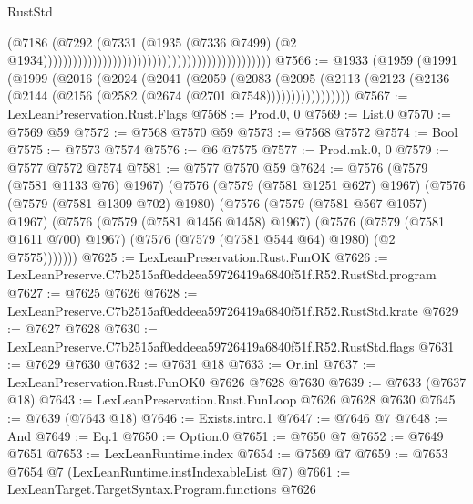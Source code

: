 \begin{lexlean}{RustStd}
\begin{coremodule}
                                                                                      (@7186
                                                                                        (@7292
                                                                                          (@7331
                                                                                            (@1935
                                                                                              (@7336
                                                                                                @7499)
                                                                                              (@2
                                                                                                @1934))))))))))))))))))))))))))))))))))))))))))))))
@7566 := @1933
    (@1959
      (@1991
        (@1999
          (@2016
            (@2024
              (@2041
                (@2059
                  (@2083
                    (@2095
                      (@2113 (@2123 (@2136 (@2144 (@2156 (@2582 (@2674 (@2701 @7548)))))))))))))))))
@7567 := LexLeanPreservation.Rust.Flags
@7568 := Prod.{0, 0}
@7569 := List.{0}
@7570 := @7569 @59
@7572 := @7568 @7570 @59
@7573 := @7568 @7572
@7574 := Bool
@7575 := @7573 @7574
@7576 := @6 @7575
@7577 := Prod.mk.{0, 0}
@7579 := @7577 @7572 @7574
@7581 := @7577 @7570 @59
@7624 := @7576
    (@7579 (@7581 @1133 @76) @1967)
    (@7576
      (@7579 (@7581 @1251 @627) @1967)
      (@7576
        (@7579 (@7581 @1309 @702) @1980)
        (@7576
          (@7579 (@7581 @567 @1057) @1967)
          (@7576
            (@7579 (@7581 @1456 @1458) @1967)
            (@7576
              (@7579 (@7581 @1611 @700) @1967)
              (@7576 (@7579 (@7581 @544 @64) @1980) (@2 @7575)))))))
@7625 := LexLeanPreservation.Rust.FunOK
@7626 := LexLeanPreserve.C7b2515af0eddeea59726419a6840f51f.R52.RustStd.program
@7627 := @7625 @7626
@7628 := LexLeanPreserve.C7b2515af0eddeea59726419a6840f51f.R52.RustStd.krate
@7629 := @7627 @7628
@7630 := LexLeanPreserve.C7b2515af0eddeea59726419a6840f51f.R52.RustStd.flags
@7631 := @7629 @7630
@7632 := @7631 @18
@7633 := Or.inl
@7637 := LexLeanPreservation.Rust.FunOK0 @7626 @7628 @7630
@7639 := @7633 (@7637 @18)
@7643 := LexLeanPreservation.Rust.FunLoop @7626 @7628 @7630
@7645 := @7639 (@7643 @18)
@7646 := Exists.intro.{1}
@7647 := @7646 @7
@7648 := And
@7649 := Eq.{1}
@7650 := Option.{0}
@7651 := @7650 @7
@7652 := @7649 @7651
@7653 := LexLeanRuntime.index
@7654 := @7569 @7
@7659 := @7653 @7654 @7 (LexLeanRuntime.instIndexableList @7)
@7661 := LexLeanTarget.TargetSyntax.Program.functions @7626

\end{coremodule}
\end{lexlean}
